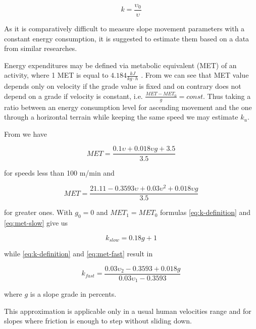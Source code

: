 \documentclass[12pt]{article}
\begin{document}
\begin{equation} \label{eq:k-definition}
k = \frac{\upsilon_{0}}{\upsilon}
\end{equation}

As it is comparatively difficult to measure slope movement parameters with a constant energy consumption, it is suggested to estimate them based on a data from similar researches.

Energy expenditures may be defined via metabolic equivalent (MET) of an activity, where 1 MET is equal to $4.184\frac{kJ}{kg\cdot{h}}$ \cite{wiki-met}. From \cite{acsm-guidelines} we can see that MET value depends only on velocity if the grade value is fixed and on contrary does not depend on a grade if velocity is constant, i.e. $\frac{MET-MET_{0}}{g} = const$. Thus taking a ratio between an energy consumption level for ascending movement and the one through a horizontal terrain while keeping the same speed we may estimate $k_{u}$.

From \cite{TODO} we have

\begin{equation} \label{eq:met-slow}
MET=\frac{0.1\upsilon+0.018\upsilon g + 3.5}{3.5}
\end{equation}

for speeds less than 100 m/min and

\begin{equation} \label{eq:met-fast}
MET=\frac{21.11 - 0.3593\upsilon + 0.03\upsilon^{2} + 0.018\upsilon g}{3.5}
\end{equation}

for greater ones. With $g_{0} = 0$ and $MET_{1} = MET_{0}$ formulas \ref{eq:k-definition} and \ref{eq:met-slow} give us

\begin{equation} \label{eq:ku-slow}
k_{slow} = 0.18g + 1
\end{equation}

while \ref{eq:k-definition} and \ref{eq:met-fast} result in

\begin{equation} \label{eq:ku-fast}
k_{fast} = \frac{0.03\upsilon_{2}-0.3593 + 0.018g}{0.03\upsilon_{1}-0.3593}
\end{equation}

where $g$ is a slope grade in percents.

This approximation is applicable only in a usual human velocities range and for slopes where friction is enough to step without sliding down.


\newpage
\appendix


\end{document}
